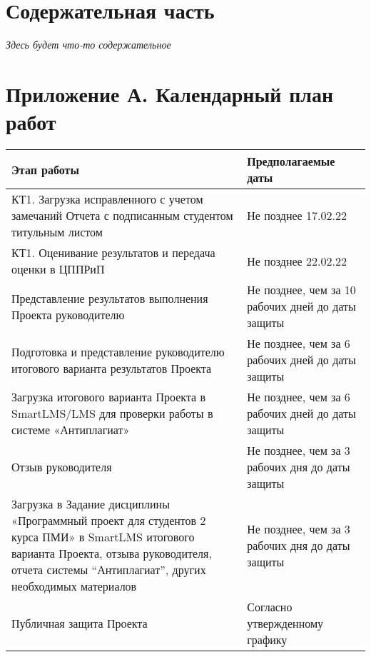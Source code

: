 \documentclass{article}
\begin{document}
\section{Содержательная часть}

\textit{Здесь будет что-то содержательное}




\section*{Приложение А. Календарный план работ}

\setlength{\tabcolsep}{18pt}
\renewcommand{\arraystretch}{1.5}
\begin{tabular}{|m{10cm}|m{5cm}|}
    \hline
    \textbf{Этап работы} & \textbf{Предполагаемые даты}\\
    \hline
    КТ1. Загрузка исправленного с учетом замечаний Отчета с подписанным студентом титульным листом & Не позднее 17.02.22\\
    \hline
    КТ1. Оценивание результатов и передача оценки в ЦППРиП & Не позднее 22.02.22\\
    \hline
    Представление результатов выполнения Проекта руководителю & Не позднее, чем за 10 рабочих дней до даты защиты\\
    \hline
    Подготовка и представление руководителю итогового варианта результатов Проекта & Не позднее, чем за 6 рабочих дней до даты защиты\\
    \hline
    Загрузка итогового варианта Проекта в SmartLMS/LMS для проверки работы в системе «Антиплагиат» & Не позднее, чем за 6 рабочих дней до даты защиты\\
    \hline
    Отзыв руководителя & Не позднее, чем за 3 рабочих дня до даты защиты\\
    \hline
    Загрузка в Задание дисциплины «Программный проект для студентов 2 курса ПМИ» в SmartLMS итогового варианта Проекта, отзыва руководителя, отчета системы “Антиплагиат”, других необходимых материалов & Не позднее, чем за 3 рабочих дня до даты защиты\\
    \hline
    Публичная защита Проекта & Согласно утвержденному графику\\
    \hline  
\end{tabular}
\end{document}
